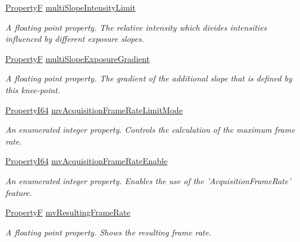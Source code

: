 \begin{DoxyCompactItemize}
\hyperlink{group___common_interface_gaf54865fe5a3d5cfd15f9a111b40d09f9}{Property\+F} \hyperlink{classmv_i_m_p_a_c_t_1_1acquire_1_1_gen_i_cam_1_1_acquisition_control_acb90c1e8ccca748148f9542b91eb3d3f}{multi\+Slope\+Intensity\+Limit}
\begin{DoxyCompactList}\small\item\em A floating point property. The relative intensity which divides intensities influenced by different exposure slopes. \end{DoxyCompactList}\item 
\hyperlink{group___common_interface_gaf54865fe5a3d5cfd15f9a111b40d09f9}{Property\+F} \hyperlink{classmv_i_m_p_a_c_t_1_1acquire_1_1_gen_i_cam_1_1_acquisition_control_a81561b228b3d765db02eeedef2bedbdf}{multi\+Slope\+Exposure\+Gradient}
\begin{DoxyCompactList}\small\item\em A floating point property. The gradient of the additional slope that is defined by this knee-\/point. \end{DoxyCompactList}\item 
\hyperlink{group___common_interface_ga81749b2696755513663492664a18a893}{Property\+I64} \hyperlink{classmv_i_m_p_a_c_t_1_1acquire_1_1_gen_i_cam_1_1_acquisition_control_a746647afd1fec502036cb9f6633f030a}{mv\+Acquisition\+Frame\+Rate\+Limit\+Mode}
\begin{DoxyCompactList}\small\item\em An enumerated integer property. Controls the calculation of the maximum frame rate. \end{DoxyCompactList}\item 
\hyperlink{group___common_interface_ga81749b2696755513663492664a18a893}{Property\+I64} \hyperlink{classmv_i_m_p_a_c_t_1_1acquire_1_1_gen_i_cam_1_1_acquisition_control_a9e010a85b016530779b5eed1a95bfa7f}{mv\+Acquisition\+Frame\+Rate\+Enable}
\begin{DoxyCompactList}\small\item\em An enumerated integer property. Enables the use of the 'Acquisition\+Frame\+Rate' feature. \end{DoxyCompactList}\item 
\hyperlink{group___common_interface_gaf54865fe5a3d5cfd15f9a111b40d09f9}{Property\+F} \hyperlink{classmv_i_m_p_a_c_t_1_1acquire_1_1_gen_i_cam_1_1_acquisition_control_a0da1e66aa1cd3ee5ae9ec1751950040a}{mv\+Resulting\+Frame\+Rate}
\begin{DoxyCompactList}\small\item\em A floating point property. Shows the resulting frame rate. \end{DoxyCompactList}\item 

\end{DoxyCompactItemize}
